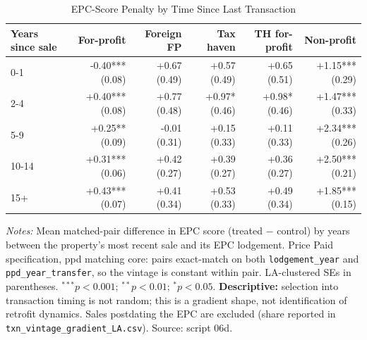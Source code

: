 \begin{table}[htbp]
\centering
\caption{EPC-Score Penalty by Time Since Last Transaction}
\label{tab:txn_vintage}
\small
\begin{tabular}{lrrrrr}
\toprule
Years since sale & For-profit & Foreign FP & Tax haven & TH for-profit & Non-profit \\
\midrule
0-1 & -0.40*** (0.08) & +0.67 (0.49) & +0.57 (0.49) & +0.65 (0.51) & +1.15*** (0.29) \\
2-4 & +0.40*** (0.08) & +0.77 (0.48) & +0.97* (0.46) & +0.98* (0.46) & +1.47*** (0.33) \\
5-9 & +0.25** (0.09) & -0.01 (0.31) & +0.15 (0.33) & +0.11 (0.33) & +2.34*** (0.26) \\
10-14 & +0.31*** (0.06) & +0.42 (0.27) & +0.39 (0.27) & +0.36 (0.27) & +2.50*** (0.21) \\
15+ & +0.43*** (0.07) & +0.41 (0.34) & +0.53 (0.33) & +0.49 (0.34) & +1.85*** (0.15) \\
\bottomrule
\end{tabular}
\begin{minipage}{0.95\textwidth}
\vspace{4pt}
\footnotesize
\textit{Notes:} Mean matched-pair difference in EPC score (treated $-$ control)
by years between the property's most recent sale and its EPC lodgement.
Price Paid specification, ppd matching core: pairs exact-match on both
\texttt{lodgement\_year} and \texttt{ppd\_year\_transfer}, so the vintage is
constant within pair. LA-clustered SEs in parentheses.
$^{***}p<0.001$; $^{**}p<0.01$; $^{*}p<0.05$.
\textbf{Descriptive:} selection into transaction timing is not random; this is a
gradient shape, not identification of retrofit dynamics. Sales postdating the EPC
are excluded (share reported in \texttt{txn\_vintage\_gradient\_LA.csv}).
Source: script 06d.
\end{minipage}
\end{table}
